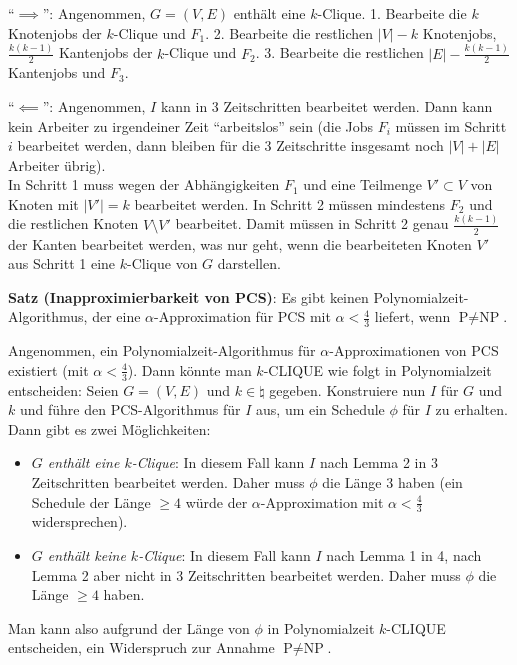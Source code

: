\begin{Beweis}
    "`$\implies$"':
    Angenommen, $G = (V, E)$ enthält eine $k$-Clique.
    1. Bearbeite die $k$ Knotenjobs der $k$-Clique und $F_1$.
    2. Bearbeite die restlichen $|V| - k$ Knotenjobs, $\frac{k(k-1)}{2}$ Kantenjobs der $k$-Clique
    und $F_2$.
    3. Bearbeite die restlichen $|E| - \frac{k(k-1)}{2}$ Kantenjobs und $F_3$.
    
    "`$\impliedby$"':
    Angenommen, $I$ kann in 3 Zeitschritten bearbeitet werden.
    Dann kann kein Arbeiter zu irgendeiner Zeit "`arbeitslos"' sein
    (die Jobs $F_i$ müssen im Schritt $i$ bearbeitet werden,
    dann bleiben für die 3 Zeitschritte insgesamt noch $|V| + |E|$ Arbeiter übrig).\\
    In Schritt 1 muss wegen der Abhängigkeiten
    $F_1$ und eine Teilmenge $V' \subset V$ von Knoten mit $|V'| = k$ bearbeitet werden.
    In Schritt 2 müssen mindestens $F_2$ und die restlichen Knoten $V \setminus V'$ bearbeitet.
    Damit müssen in Schritt 2 genau $\frac{k(k-1)}{2}$ der Kanten bearbeitet werden,
    was nur geht, wenn die bearbeiteten Knoten $V'$ aus Schritt 1 eine $k$-Clique von $G$
    darstellen.
\end{Beweis}

\linie

\textbf{Satz (Inapproximierbarkeit von PCS)}:
Es gibt keinen Polynomialzeit-Algorithmus,
der eine $\alpha$-Approximation für PCS mit $\alpha < \frac{4}{3}$ liefert,
wenn $\text{P} \not= \text{NP}$.

\begin{Beweis}
    Angenommen, ein Polynomialzeit-Algorithmus für $\alpha$-Approximationen von PCS existiert
    (mit $\alpha < \frac{4}{3}$).
    Dann könnte man $k$-CLIQUE wie folgt in Polynomialzeit entscheiden:
    Seien $G = (V, E)$ und $k \in \natural$ gegeben.
    Konstruiere nun $I$ für $G$ und $k$ und führe den PCS-Algorithmus für $I$ aus,
    um ein Schedule $\phi$ für $I$ zu erhalten.
    Dann gibt es zwei Möglichkeiten:
    \begin{itemize}
        \item
        \emph{$G$ enthält eine $k$-Clique}:
        In diesem Fall kann $I$ nach Lemma 2 in 3 Zeitschritten bearbeitet werden.
        Daher muss $\phi$ die Länge $3$ haben
        (ein Schedule der Länge $\ge 4$ würde der $\alpha$-Approximation mit $\alpha < \frac{4}{3}$
        widersprechen).
        
        \item
        \emph{$G$ enthält keine $k$-Clique}:
        In diesem Fall kann $I$ nach Lemma 1 in 4,
        nach Lemma 2 aber nicht in 3 Zeitschritten bearbeitet werden.
        Daher muss $\phi$ die Länge $\ge 4$ haben.
    \end{itemize}
    Man kann also aufgrund der Länge von $\phi$ in Polynomialzeit $k$-CLIQUE entscheiden,
    ein Widerspruch zur Annahme $\text{P} \not= \text{NP}$.
\end{Beweis}

